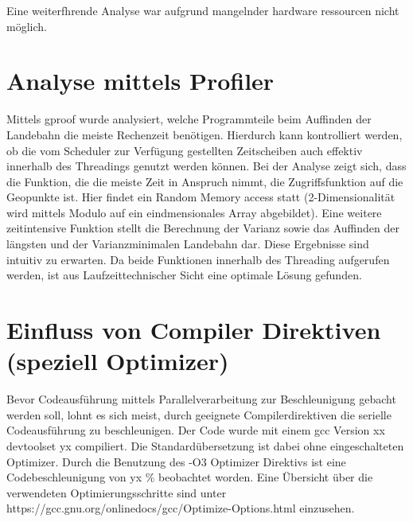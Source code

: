 \documentclass[10pt,a4paper]{report}
\begin{document}
Eine weiterfhrende Analyse war aufgrund mangelnder hardware ressourcen nicht möglich.
\section{Analyse mittels Profiler}

Mittels gproof wurde analysiert, welche Programmteile beim Auffinden der Landebahn die meiste Rechenzeit benötigen. Hierdurch kann kontrolliert werden, ob die vom Scheduler zur Verfügung gestellten Zeitscheiben auch effektiv innerhalb des Threadings genutzt werden können. 
Bei der Analyse zeigt sich, dass die Funktion, die die meiste Zeit in Anspruch nimmt, die Zugriffsfunktion auf die Geopunkte ist. Hier findet ein Random Memory access statt (2-Dimensionalität wird mittels Modulo auf ein eindmensionales Array abgebildet).
Eine weitere zeitintensive Funktion stellt die Berechnung der Varianz sowie das Auffinden der längsten und der Varianzminimalen Landebahn dar.
Diese Ergebnisse sind intuitiv zu erwarten.
Da beide Funktionen innerhalb des Threading aufgerufen werden, ist aus Laufzeittechnischer Sicht eine optimale Lösung gefunden. 

\section{Einfluss von Compiler Direktiven (speziell Optimizer)}

Bevor Codeausführung mittels Parallelverarbeitung zur Beschleunigung gebacht werden soll, lohnt es sich meist, durch geeignete Compilerdirektiven die serielle Codeausführung zu beschleunigen.
Der Code wurde mit einem gcc Version xx devtoolset yx compiliert. Die Standardübersetzung ist dabei ohne eingeschalteten Optimizer. 
Durch die Benutzung des -O3 Optimizer Direktivs ist eine Codebeschleunigung von yx \% beobachtet worden. 
Eine Übersicht über die verwendeten Optimierungsschritte sind unter https://gcc.gnu.org/onlinedocs/gcc/Optimize-Options.html einzusehen.
\end{document}
